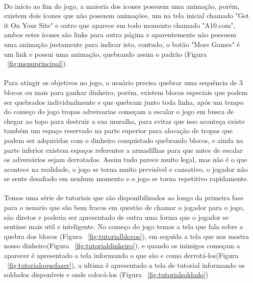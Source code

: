 \documentclass[12pt]{article}
\begin{document}
\paragraph{} Do início ao fim do jogo, a maioria dos icones possuem uma animação, porém, existem dois ícones que não possuem animações, um na tela inicial chamado "Get it On Your Site" e outro que aparece em todo momento chamado "A10.com", ambos estes ícones são links para outra página e aparentemente não possuem uma animação justamente para indicar isto, contudo, o botão "More Games" é um link e possui uma animação, quebrando assim o padrão (Figura ~\ref{fig:menuprincipal}).
\paragraph{} Para atingir os objetivos no jogo, o usuário precisa quebrar uma sequência de 3 blocos ou mais para ganhar dinheiro, porém, existem blocos especiais que podem ser quebrados individualmente e que quebram junto toda linha, após um tempo do começo do jogo tropas adversarias começam a escalar o jogo em busca de chegar ao topo para destruir a sua muralha, para evitar que isso aconteça existe também um espaço reservado na parte superior para alocação de tropas que podem ser adquiridas com o dinheiro conquistado quebrando blocos, e ainda na parte inferior existem espaços referentes a armadilhas para que antes de escalar os adversários sejam derrotados. Assim tudo parece muito legal, mas não é o que acontece na realidade, o jogo se torna muito previsível e cansativo, o jogador não se sente desafiado em nenhum momento e o jogo se torna repetitivo rapidamente.
\paragraph{} Temos uma série de tutoriais que são disponibilizados ao longo da primeira fase para o usuario que são bem fracos em questão de chamar o jogador para o jogo, são diretos e poderia ser apresentado de outra uma forma que o jogador se sentisse mais util e inteligente. No começo do jogo temos a tela que fala sobre a quebra dos blocos (Figura ~\ref{fig:tutorialblocos}), em seguida a tela que nos mostra nosso dinheiro(Figura ~\ref{fig:tutorialdinheiro}), e quando os inimigos começam a aparecer é apresentado a tela informando o que são e como derrotá-los(Figura ~\ref{fig:tutorialoquefazer}), a ultima é apresentado a tela de tutorial informando os soldados disponíveis e onde colocá-los (Figura ~\ref{fig:tutorialsoldado})
\end{document}
